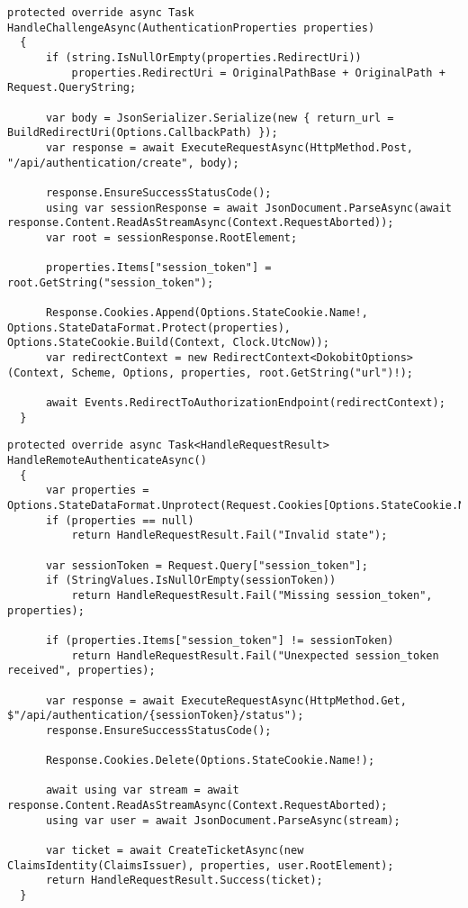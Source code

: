 \begin{lstlisting}[caption={Handling Dokobit session creation}, label={lst:dokobit-challenge}]
  protected override async Task HandleChallengeAsync(AuthenticationProperties properties)
  {
      if (string.IsNullOrEmpty(properties.RedirectUri))
          properties.RedirectUri = OriginalPathBase + OriginalPath + Request.QueryString;

      var body = JsonSerializer.Serialize(new { return_url = BuildRedirectUri(Options.CallbackPath) });
      var response = await ExecuteRequestAsync(HttpMethod.Post, "/api/authentication/create", body);

      response.EnsureSuccessStatusCode();
      using var sessionResponse = await JsonDocument.ParseAsync(await response.Content.ReadAsStreamAsync(Context.RequestAborted));
      var root = sessionResponse.RootElement;

      properties.Items["session_token"] = root.GetString("session_token");

      Response.Cookies.Append(Options.StateCookie.Name!, Options.StateDataFormat.Protect(properties), Options.StateCookie.Build(Context, Clock.UtcNow));
      var redirectContext = new RedirectContext<DokobitOptions>(Context, Scheme, Options, properties, root.GetString("url")!);

      await Events.RedirectToAuthorizationEndpoint(redirectContext);
  }
\end{lstlisting}

\begin{lstlisting}[caption={Handling access token creation}, label={lst:dokobit-handleremote}]
  protected override async Task<HandleRequestResult> HandleRemoteAuthenticateAsync()
  {
      var properties = Options.StateDataFormat.Unprotect(Request.Cookies[Options.StateCookie.Name!]);
      if (properties == null)
          return HandleRequestResult.Fail("Invalid state");
  
      var sessionToken = Request.Query["session_token"];
      if (StringValues.IsNullOrEmpty(sessionToken))
          return HandleRequestResult.Fail("Missing session_token", properties);
  
      if (properties.Items["session_token"] != sessionToken)
          return HandleRequestResult.Fail("Unexpected session_token received", properties);
  
      var response = await ExecuteRequestAsync(HttpMethod.Get, $"/api/authentication/{sessionToken}/status");
      response.EnsureSuccessStatusCode();
  
      Response.Cookies.Delete(Options.StateCookie.Name!);
  
      await using var stream = await response.Content.ReadAsStreamAsync(Context.RequestAborted);
      using var user = await JsonDocument.ParseAsync(stream);
  
      var ticket = await CreateTicketAsync(new ClaimsIdentity(ClaimsIssuer), properties, user.RootElement);
      return HandleRequestResult.Success(ticket);
  }
\end{lstlisting}

